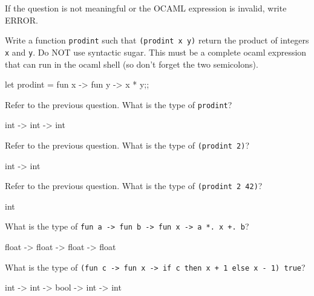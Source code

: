 

\renewcommand\AUTHOR{nweadick1@cougars.ccis.edu} %


\topmattertwo

If the question is not meaningful or the OCAML expression is invalid, write ERROR.

\nextq
Write a function \texttt{prodint} such that \texttt{(prodint x y)} return
the product of integers \verb!x! and \verb!y!.
Do NOT use syntactic sugar.
This must be a complete ocaml expression that can run in the ocaml shell (so
don't forget the two semicolons).
\\
\ANSWER
\begin{answercode}
let prodint = fun x -> fun y -> x * y;;
\end{answercode}

\nextq
Refer to the previous question. 
What is the type of \verb!prodint!?
\\
\ANSWER
\begin{answercode}
int -> int -> int
\end{answercode}

\nextq
Refer to the previous question. 
What is the type of \verb!(prodint 2)!?
\\
\ANSWER
\begin{answercode}
int -> int
\end{answercode}

\nextq
Refer to the previous question. 
What is the type of \verb!(prodint 2 42)!?
\\
\ANSWER
\begin{answercode}
int
\end{answercode}

\nextq
What is the type of \verb!fun a -> fun b -> fun x -> a *. x +. b!?
\\
\ANSWER
\begin{answercode}
float -> float -> float -> float
\end{answercode}

\nextq
What is the type of \verb!(fun c -> fun x -> if c then x + 1 else x - 1) true!?
\\
\ANSWER
\begin{answercode}
int -> int -> bool -> int -> int
\end{answercode}

\newpage




